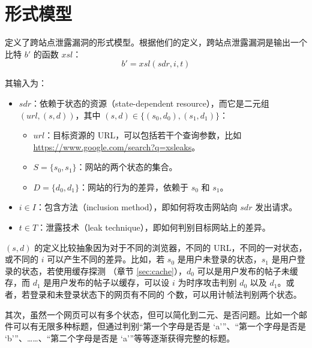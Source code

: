 \section{形式模型}

\citeauthor{modelbase} \cite{modelbase} 定义了跨站点泄露漏洞的形式模型。根据他们的定义，跨站点泄露漏洞是输出一个比特 $b'$ 的函数 $xsl$：
$$b'=xsl(sdr, i, t)$$

其输入为：

\begin{itemize}
    \item $sdr$：依赖于状态的资源（state-dependent resource），而它是二元组 $(url, (s, d))$，其中 $(s, d)\in\{(s_0, d_0), (s_1, d_1)\}$：
    \begin{itemize}
        \item $url$：目标资源的 URL，可以包括若干个查询参数，比如 \url{https://www.google.com/search?q=xsleaks}。
        \item $S=\{s_0, s_1\}$：网站的两个状态的集合。
        \item $D=\{d_0, d_1\}$：网站的行为的差异，依赖于 $s_0$ 和 $s_1$。
    \end{itemize}
    \item $i\in I$：包含方法（inclusion method），即如何将攻击网站向 $sdr$ 发出请求。
    \item $t\in T$：泄露技术（leak technique），即如何判别目标网站上的差异。
\end{itemize}

$(s,d)$ 的定义比较抽象因为对于不同的浏览器，不同的 URL，不同的一对状态，或不同的 $i$ 可以产生不同的差异。比如，若 $s_0$ 是用户未登录的状态，$s_1$ 是用户登录的状态，若使用缓存探测 （章节 \ref{sec:cache}），$d_0$ 可以是用户发布的帖子未缓存，而 $d_1$ 是用户发布的帖子以缓存，可以设 $i$ 为时序攻击判别 $d_0$ 以及 $d_1$。或者，若登录和未登录状态下的网页有不同的  个数，可以用计帧法判别两个状态。

其次，虽然一个网页可以有多个状态，但可以简化到二元、是否问题。比如一个邮件可以有无限多种标题，但通过判别“第一个字母是否是 ‘a’”、“第一个字母是否是 ‘b’”、……、“第二个字母是否是 ‘a’”等等逐渐获得完整的标题。